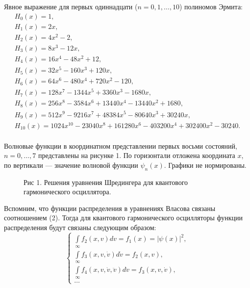 \documentclass[a4paper,14pt]{article}
\begin{document}
Явное выражение для первых одиннадцати ($n = 0,1,…,10$) полиномов Эрмита:
$$
\begin{array}{l}
{H_{0}(x)=1}, \\ 
{H_{1}(x)=2 x}, \\ 
{H_{2}(x)=4 x^{2}-2}, \\ 
{H_{3}(x)=8 x^{3}-12 x}, \\ 
{H_{4}(x)=16 x^{4}-48 x^{2}+12}, \\ 
{H_{5}(x)=32 x^{5}-160 x^{3}+120 x}, \\
{H_{6}(x)=64 x^{6}-480 x^{4}+720 x^{2}-120}, \\ 
{H_{7}(x)=128 x^{7}-1344 x^{5}+3360 x^{3}-1680 x}, \\ 
{H_{8}(x)=256 x^{8}-3584 x^{6}+13440 x^{4}-13440 x^{2}+1680}, \\ 
{H_{9}(x)=512 x^{9}-9216 x^{7}+48384 x^{5}-80640 x^{3}+30240 x}, \\ 
H_{10}(x)=1024 x^{10}-23040 x^{8}+161280 x^{6}-403200 x^{4}+302400 x^{2}-30240. \\
\end{array}
$$

Волновые функции в координатном представлении первых восьми состояний, $n = 0,\ldots , 7$ представлены на рисунке 1. По горизонтали отложена координата $x$, по вертикали — значение волновой функции $\psi _n(x)$. Графики не нормированы.
\begin{figure}[H]
	\caption*{Рис 1. Решения уравнения Шредингера для квантового гармонического осциллятора.}
	\label{fig:image}
\end{figure}

Вспомним, что функции распределения в уравнениях Власова связаны соотношением (2). Тогда для квантового гармонического осцилляторы функции распределения будут связаны следующим образом:
\begin{equation}
\begin{cases}
\int\limits_{\infty} f_2(x, v) dv = f_1(x) = |\psi(x)|^2,\\
\int\limits_{\infty}f_3(x, v, \dot v) d\dot v = f_2(x, v), \\
\int\limits_{\infty}f_4(x, v, \dot v, \ddot v) d\ddot v = f_3(x, v, \dot v), \\
\ldots 
\end{cases}
\end{equation}
\end{document}
